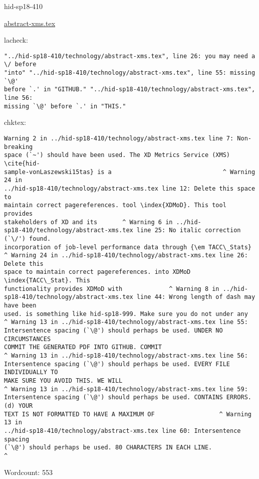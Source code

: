 \begin{IU}

hid-sp18-410

\href{https://github.com/cloudmesh-community/hid-sp18-410/blob/master//technology/abstract-xms.tex}{abstract-xms.tex}

 
lacheck:
\begin{tiny}
\begin{verbatim}
"../hid-sp18-410/technology/abstract-xms.tex", line 26: you may need a \/ before
"into" "../hid-sp18-410/technology/abstract-xms.tex", line 55: missing `\@'
before `.' in "GITHUB." "../hid-sp18-410/technology/abstract-xms.tex", line 56:
missing `\@' before `.' in "THIS."
\end{verbatim}
\end{tiny}
chktex:
\begin{tiny}
\begin{verbatim}
Warning 2 in ../hid-sp18-410/technology/abstract-xms.tex line 7: Non-breaking
space (`~') should have been used. The XD Metrics Service (XMS) \cite{hid-
sample-vonLaszewski15tas} is a                               ^ Warning 24 in
../hid-sp18-410/technology/abstract-xms.tex line 12: Delete this space to
maintain correct pagereferences. tool \index{XDMoD}. This tool provides
stakeholders of XD and its       ^ Warning 6 in ../hid-
sp18-410/technology/abstract-xms.tex line 25: No italic correction (`\/') found.
incorporation of job-level performance data through {\em TACC\_Stats}
^ Warning 24 in ../hid-sp18-410/technology/abstract-xms.tex line 26: Delete this
space to maintain correct pagereferences. into XDMoD \index{TACC\_Stat}. This
functionality provides XDMoD with             ^ Warning 8 in ../hid-
sp18-410/technology/abstract-xms.tex line 44: Wrong length of dash may have been
used. is something like hid-sp18-999. Make sure you do not under any
^ Warning 13 in ../hid-sp18-410/technology/abstract-xms.tex line 55:
Intersentence spacing (`\@') should perhaps be used. UNDER NO CIRCUMSTANCES
COMMIT THE GENERATED PDF INTO GITHUB. COMMIT
^ Warning 13 in ../hid-sp18-410/technology/abstract-xms.tex line 56:
Intersentence spacing (`\@') should perhaps be used. EVERY FILE INDIVIDUALLY TO
MAKE SURE YOU AVOID THIS. WE WILL
^ Warning 13 in ../hid-sp18-410/technology/abstract-xms.tex line 59:
Intersentence spacing (`\@') should perhaps be used. CONTAINS ERRORS. (d) YOUR
TEXT IS NOT FORMATTED TO HAVE A MAXIMUM OF                  ^ Warning 13 in
../hid-sp18-410/technology/abstract-xms.tex line 60: Intersentence spacing
(`\@') should perhaps be used. 80 CHARACTERS IN EACH LINE.
^
\end{verbatim}
\end{tiny}

Wordcount: 553

\end{IU}

